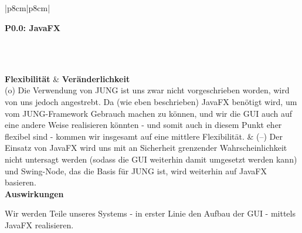 \documentclass[enabledeprecatedfontcommands,fontsize=11pt,paper=a4,twoside]{scrartcl}
\newcounter{one}
\newcounter{two}[one]
\newcommand{\tone}{0\theone}
\newcommand{\two}{\stepcounter{two}0\thetwo}
\begin{document}
\\ \\ \\ \\%
\begin{tabular} {|p{8cm}|p{8cm}|}
	\hline
	 {\parbox{16cm}{\textbf{\hypertarget{j}{P\tone.\two}: JavaFX }} } \\ \hline\hline 
	\rule{0pt}{10ex}\\ [7ex] \hline
	\textbf{Flexibilität}  & \textbf{Veränderlichkeit} \\
	(o) Die Verwendung von JUNG ist uns zwar nicht vorgeschrieben worden, wird von uns jedoch angestrebt. Da (wie eben beschrieben) JavaFX benötigt wird, um vom JUNG-Framework Gebrauch machen zu können, und wir die GUI auch auf eine andere Weise realisieren könnten - und somit auch in diesem Punkt eher flexibel sind - kommen wir insgesamt auf eine mittlere Flexibilität. &
	(--) Der Einsatz von JavaFX wird uns mit an Sicherheit grenzender Wahrscheinlichkeit nicht untersagt werden (sodass die GUI weiterhin damit umgesetzt werden kann) und Swing-Node, das die Basis für JUNG ist, wird weiterhin auf JavaFX basieren.\\
	\hline
	 {\textbf{Auswirkungen}} \\
	 {\parbox{16cm}{Wir werden Teile unseres Systems - in erster Linie den Aufbau der GUI - mittels JavaFX realisieren. } }\\ \hline
\end{tabular}
\\ \\ \\ \\%
\end{document}

